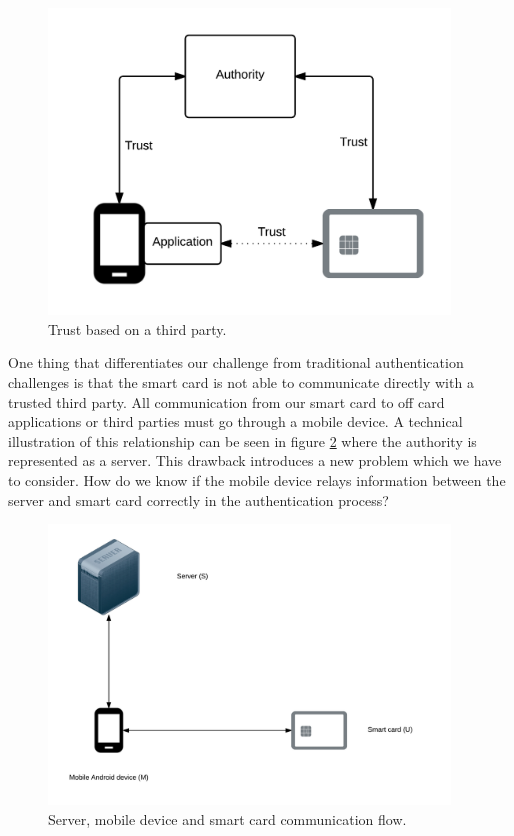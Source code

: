 \begin{figure}[h!]
  \caption{Trust based on a third party.}
  \label{fig:standardAuth}
  \centering
    \includegraphics[width=0.95\textwidth]{images/standardAuth2.png}
\end{figure}

One thing that differentiates our challenge from traditional authentication challenges is that the smart card is not able to communicate directly with a trusted third party. All communication from our smart card to off card applications or third parties must go through a mobile device. A technical illustration of this relationship can be seen in figure \ref{fig:smu} where the authority is represented as a server. This drawback introduces a new problem which we have to consider. How do we know if the mobile device relays information between the server and smart card correctly in the authentication process?

\begin{figure}[h!]
  \caption{Server, mobile device and smart card communication flow.}
  \label{fig:smu}
  \centering
    \includegraphics[width=0.95\textwidth]{images/SMU.png}
\end{figure}

